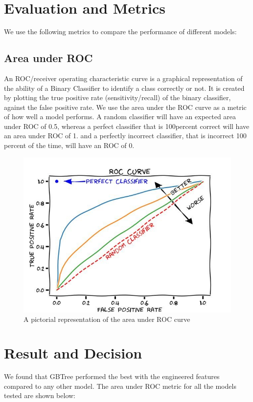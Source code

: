 \documentclass[sigconf, nonacm]{acmart}
\begin{document}
\section{Evaluation and Metrics}

We use the following metrics to compare the performance of different models:

\subsection{Area under ROC}
An ROC/receiver operating characteristic curve is a graphical representation of the ability of a Binary Classifier to identify a class correctly or not. It is created by plotting the true positive rate (sensitivity/recall) of the binary classifier, against the false positive rate. We use the area under the ROC curve as a metric of how well a model performs.
A random classifier will have an expected area under ROC of 0.5, whereas a perfect classifier that is 100percent correct will have an area under ROC of 1. and a perfectly incorrect classifier, that is incorrect 100 percent of the time, will have an ROC of 0.

\begin{figure}[htp]
    \includegraphics[width=\linewidth]{figures/EQN5.jpg}
    \caption{A pictorial representation of the area under ROC curve\cite{xkcd}}
\end{figure}

\section{Result and Decision}
We found that GBTree performed the best with the engineered features compared to any other model. The area under ROC metric for all the models tested are shown below:
\end{document}
